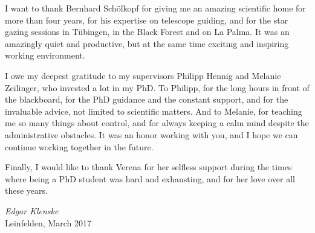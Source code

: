 I want to thank Bernhard Sch{\"o}lkopf for giving me an amazing scientific home
for more than four years, for his expertise on telescope guiding,
and for the star gazing sessions in T{\"u}bingen, in the Black Forest and on La
Palma. It was an amazingly quiet and productive, but at the same time
exciting and inspiring working environment.

I owe my deepest gratitude to my supervisors Philipp Hennig and Melanie
Zeilinger, who invested a lot in my PhD. To Philipp, for the long hours in
front of the blackboard, for the PhD guidance and the constant support, and
for the invaluable advice, not limited to scientific matters. And to Melanie,
for teaching me so many things about control, and for always keeping a calm
mind despite the administrative obstacles. It was an honor working with you,
and I hope we can continue working together in the future.

Finally, I would like to thank Verena for her selfless support during the times
where being a PhD student was hard and exhausting, and for her love over all
these years.

\begin{flushright}
{\slshape Edgar Klenske}\\
Leinfelden, March 2017
\end{flushright}
\endgroup



